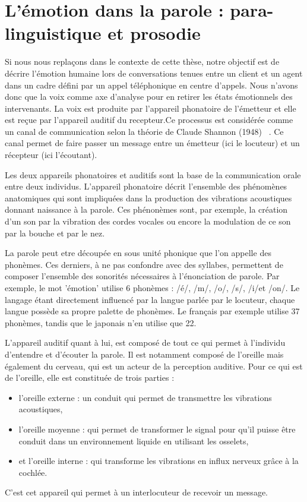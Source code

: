 \section{L'émotion dans la parole : para-linguistique et prosodie}
Si nous nous replaçons dans le contexte de cette thèse, notre objectif est de décrire l'émotion humaine lors de conversations tenues entre un client et un agent dans un cadre défini par un appel téléphonique en centre d'appels. Nous n'avons donc que la voix comme axe d'analyse pour en retirer les états émotionnels des intervenants.
La voix est produite par l'appareil phonatoire de l'émetteur et elle est reçue par l'appareil auditif du recepteur.Ce processus est considérée comme un canal de communication selon la théorie de Claude Shannon (1948) ~\cite{Shannon1948}. Ce canal permet de faire passer un message entre un émetteur (ici le locuteur) et un récepteur (ici l'écoutant).

Les deux appareils phonatoires et auditifs sont la base de la communication orale entre deux individus. L'appareil phonatoire décrit l'ensemble des phénomènes anatomiques qui sont impliquées dans la production des vibrations acoustiques donnant naissance à la parole. Ces phénonèmes sont, par exemple, la création d'un son par la vibration des cordes vocales ou encore la modulation de ce son par la bouche et par le nez.

La parole peut etre découpée en sous unité phonique que l'on appelle des phonèmes. Ces derniers, à ne pas confondre avec des syllabes, permettent de composer l'ensemble des sonorités nécessaires à l'énonciation de parole.
Par exemple, le mot 'émotion' utilise 6 phonèmes : /é/, /m/, /o/, /s/, /i/et /on/.
Le langage étant directement influencé par la langue parlée par le locuteur, chaque langue possède sa propre palette de phonèmes. Le français par exemple utilise 37 phonèmes, tandis que le japonais n'en utilise que 22.

L'appareil auditif quant à lui, est composé de tout ce qui permet à l'individu d'entendre et d'écouter la parole. Il est notamment composé de l'oreille mais également du cerveau, qui est un acteur de la perception auditive. Pour ce qui est de l'oreille, elle est constituée de trois parties :
\begin{itemize}
  \item l'oreille externe : un conduit qui permet de transmettre les vibrations acoustiques,
  \item l'oreille moyenne : qui permet de transformer le signal pour qu'il puisse être conduit dans un environnement liquide en utilisant les osselets,
  \item et l'oreille interne : qui transforme les vibrations en influx nerveux grâce à la cochlée.
\end{itemize}
C'est cet appareil qui permet à un interlocuteur de recevoir un message.

